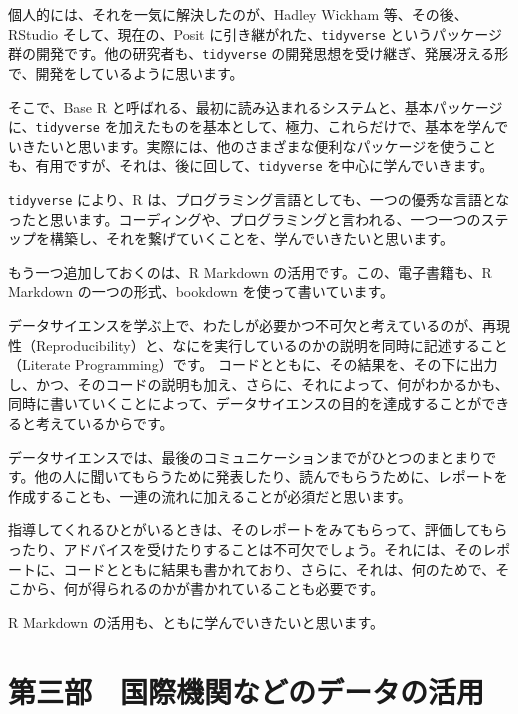 \documentclass[
  xelatex, ja=standard]{bxjsbook}
\theoremstyle{definition}
\theoremstyle{definition}
\theoremstyle{definition}
\theoremstyle{definition}
\theoremstyle{remark}
\begin{document}
個人的には、それを一気に解決したのが、Hadley Wickham 等、その後、RStudio そして、現在の、Posit に引き継がれた、\texttt{tidyverse} というパッケージ群の開発です。他の研究者も、\texttt{tidyverse} の開発思想を受け継ぎ、発展冴える形で、開発をしているように思います。

そこで、Base R と呼ばれる、最初に読み込まれるシステムと、基本パッケージに、\texttt{tidyverse} を加えたものを基本として、極力、これらだけで、基本を学んでいきたいと思います。実際には、他のさまざまな便利なパッケージを使うことも、有用ですが、それは、後に回して、\texttt{tidyverse} を中心に学んでいきます。

\texttt{tidyverse} により、R は、プログラミング言語としても、一つの優秀な言語となったと思います。コーディングや、プログラミングと言われる、一つ一つのステップを構築し、それを繋げていくことを、学んでいきたいと思います。

もう一つ追加しておくのは、R Markdown の活用です。この、電子書籍も、R Markdown の一つの形式、bookdown を使って書いています。

データサイエンスを学ぶ上で、わたしが必要かつ不可欠と考えているのが、再現性（Reproducibility）と、なにを実行しているのかの説明を同時に記述すること（Literate Programming）です。 コードとともに、その結果を、その下に出力し、かつ、そのコードの説明も加え、さらに、それによって、何がわかるかも、同時に書いていくことによって、データサイエンスの目的を達成することができると考えているからです。

データサイエンスでは、最後のコミュニケーションまでがひとつのまとまりです。他の人に聞いてもらうために発表したり、読んでもらうために、レポートを作成することも、一連の流れに加えることが必須だと思います。

指導してくれるひとがいるときは、そのレポートをみてもらって、評価してもらったり、アドバイスを受けたりすることは不可欠でしょう。それには、そのレポートに、コードとともに結果も書かれており、さらに、それは、何のためで、そこから、何が得られるのかが書かれていることも必要です。

R Markdown の活用も、ともに学んでいきたいと思います。

\hypertarget{ux7b2cux4e09ux90e8-ux56fdux969bux6a5fux95a2ux306aux3069ux306eux30c7ux30fcux30bfux306eux6d3bux7528}{%
\section{第三部　国際機関などのデータの活用}\label{ux7b2cux4e09ux90e8-ux56fdux969bux6a5fux95a2ux306aux3069ux306eux30c7ux30fcux30bfux306eux6d3bux7528}}
\end{document}
